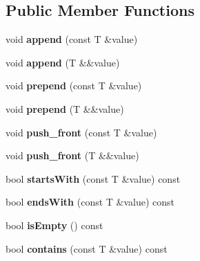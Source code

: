 \subsection*{Public Member Functions}
\begin{DoxyCompactItemize}
\item 
\mbox{\label{class_a_vector_ab998b222eb341c26f4eafd8da65f2274}} 
void {\bfseries append} (const T \&value)
\item 
\mbox{\label{class_a_vector_aae594c91729d29605c2fe4a71cbf6f0c}} 
void {\bfseries append} (T \&\&value)
\item 
\mbox{\label{class_a_vector_a5b7910c1c1dce6877a21f9c5cba4bfc2}} 
void {\bfseries prepend} (const T \&value)
\item 
\mbox{\label{class_a_vector_a13f40bde5b40222d98fe0982eaca9513}} 
void {\bfseries prepend} (T \&\&value)
\item 
\mbox{\label{class_a_vector_a18f64e22552d73fc4424dc81ba158216}} 
void {\bfseries push\+\_\+front} (const T \&value)
\item 
\mbox{\label{class_a_vector_a0050a46da378811f3ff5fc4df73ecd62}} 
void {\bfseries push\+\_\+front} (T \&\&value)
\item 
\mbox{\label{class_a_vector_a7cc825790e29f58f9425fd11efbdbbab}} 
bool {\bfseries starts\+With} (const T \&value) const
\item 
\mbox{\label{class_a_vector_a9cae5f201ad8fb74850f1d1dc2d044cc}} 
bool {\bfseries ends\+With} (const T \&value) const
\item 
\mbox{\label{class_a_vector_a66aa4c45a9c4126a0e97d225add9047a}} 
bool {\bfseries is\+Empty} () const
\item 
\mbox{\label{class_a_vector_ab49821902c6048beab9de0e355baa386}} 
bool {\bfseries contains} (const T \&value) const
\item 
\mbox{\label{class_a_vector_aa7ffcbc3145155967e6e18cacc3a0dcc}} 

\end{DoxyCompactItemize}

